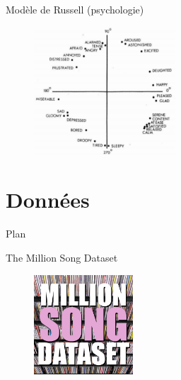 \documentclass{beamer}
\begin{document}
\begin{frame}{Modèle de Russell (psychologie)}


        \begin{figure}
            \centering
            \includegraphics[width=200px]{images/russell_2.png}
        \end{figure}

\end{frame}

\section{Données}
\begin{frame}{Plan}
      \tableofcontents[currentsection]
  \end{frame}

\begin{frame}{The Million Song Dataset}
\begin{figure}
\centering
\includegraphics[width=140px]{images/millionsong2.jpg}
\end{figure}
%
%
\end{frame}
\end{document}
